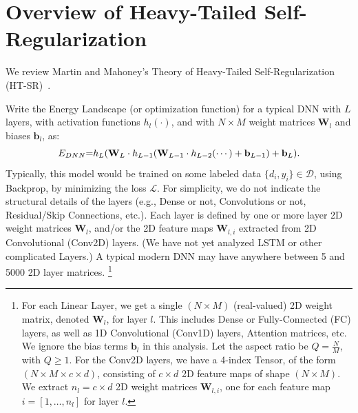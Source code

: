 
\vspace{-2mm}

\section{Overview of Heavy-Tailed Self-Regularization}
\label{sxn:theory-review}

\vspace{-1mm}

We review Martin and Mahoney's Theory of Heavy-Tailed Self-Regularization (HT-SR)~\cite{MM18_TR,MM19_HTSR_ICML}.

Write the Energy Landscape (or optimization function) for a typical DNN with $L$ layers, with activation functions $h_{l}(\cdot)$, and with $N\times M$ weight matrices $\mathbf{W}_{l}$ and biases $\mathbf{b}_{l}$, as:
\begin{equation*}
E_{DNN} \hspace{-1mm} = \hspace{-1mm} h_{L}(\mathbf{W}_{L}\cdot h_{L-1}(\mathbf{W}_{L-1}\cdot h_{L-2}(\cdots)+\mathbf{b}_{L-1})+\mathbf{b}_{L})  .
\end{equation*}
Typically, this model would be trained on some labeled data $\{d_{i},y_{i}\}\in\mathcal{D}$, using Backprop, by minimizing the loss $\mathcal{L}$.
For simplicity, we do not indicate the structural details of the layers (e.g., Dense or not, Convolutions or not, Residual/Skip Connections, etc.). 
Each layer is defined by one or more layer 2D weight matrices $\mathbf{W}_{l}$, and/or the 2D feature maps $\mathbf{W}_{l,i}$ extracted from 2D Convolutional (Conv2D) layers.
(We have not yet analyzed LSTM or other complicated Layers.) 
A typical modern DNN may have anywhere between 5 and 5000 2D layer matrices.%
\footnote{%
For each Linear Layer, we get a  single $(N\times M)$ (real-valued) 2D weight matrix, denoted $\mathbf{W}_{l}$, for layer $l$.  
This includes Dense or Fully-Connected (FC) layers, as well as 1D Convolutional (Conv1D) layers, Attention matrices, etc.
We ignore the bias terms $\mathbf{b}_{l}$ in this analysis. 
Let the aspect ratio be $Q=\frac{N}{M}$, with $Q\ge 1$.
For the Conv2D layers, we have a 4-index Tensor, of the form $(N\times M \times c\times d)$, consisting
of $c\times d$ 2D feature maps of shape $(N\times M)$.    
We  extract $n_{l}=c\times d$ 2D weight matrices $\mathbf{W}_{l,i}$, one for each feature map $i=[1,\dots,n_{l}]$ for layer $l$.
}
   

